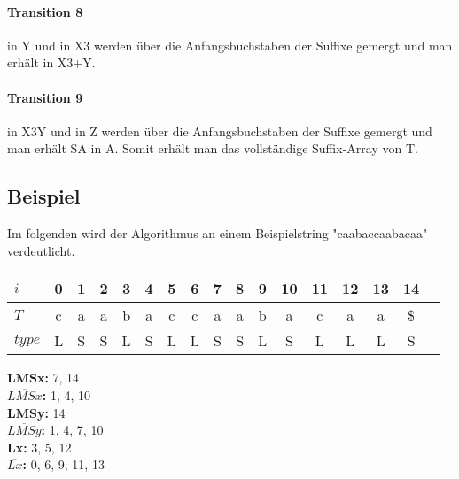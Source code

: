 \paragraph{Transition 8}
\SAlysx in Y und \SAlynot in X3 werden über die Anfangsbuchstaben der Suffixe gemergt und man erhält \SAlsx in X3+Y.
\paragraph{Transition 9}
\SAlsx in X3Y und \SAsxnot in Z werden über die Anfangsbuchstaben der Suffixe gemergt und man erhält SA in A.
\bigskip
Somit erhält man das vollständige Suffix-Array von T.
\subsection{Beispiel}
Im folgenden wird der Algorithmus an einem Beispielstring "caabaccaabacaa" verdeutlicht.
\begin{center}
    \begin{tabular}{ | l | c | c | c | c | c | c | c | c | c | c | c | c | c | c | c | c | }
        \hline
        $i$ & 0 & 1 & 2 & 3 & 4 & 5 & 6 & 7 & 8 & 9 & 10 & 11 & 12 & 13 & 14 \\ \hline
        $T$ & c & a & a & b & a & c & c & a & a & b & a & c & a & a & \$ \\ \hline
        $type$ & L & S & S & L & S & L & L & S & S & L & S & L & L & L & S \\ 
        \hline
    \end{tabular}
\end{center}
\textbf{LMSx:} 7, 14\\
\textbf{$\overline{LMSx}$:} 1, 4, 10\\
\textbf{LMSy:} 14\\
\textbf{$\overline{LMSy}$:} 1, 4, 7, 10\\
\textbf{Lx:} 3, 5, 12\\
\textbf{$\overline{Lx}$:} 0, 6, 9, 11, 13\\
